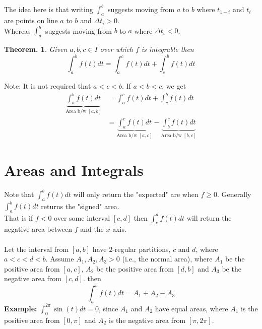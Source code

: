 \documentclass[11pt, a4paper]{memoir}
\theoremstyle{change}
\newtheorem{theorem}{Theorem.}[section]
\theoremstyle{plain}
\theoremstyle{nonumberplain}
\numberwithin{equation}{section}
\begin{document}
The idea here is that writing $\int^b_a$ suggests moving from $a$ to $b$ where $t_{1-i}$ and $t_i$ are points on line $a$ to $b$ and $\Delta t_i > 0$.\\
Whereas $\int^b_a$ suggests moving from $b$ to $a$ where $\Delta t_i < 0$.
\begin{theorem}
Given $a, b, c \in I$ over which $f$ is integrable then $$\int^b_a f(t) dt = \int^c_a f(t) dt + \int^b_c f(t) dt$$
\end{theorem}
Note: It is not required that $a < c < b$. 
If $a< b< c$, we get
\begin{align*}
    \underbrace{\int^b_a f(t) dt}_{\text{Area b/w } [a, b]} &= \int^c_a f(t) dt + \int^b_c f(t) dt\\
    &= \underbrace{\int^c_a f(t) dt}_{\text{Area b/w }[a, c]} -\underbrace{\int^c_b f(t) dt}_{\text{Area b/w }[b, c]}
\end{align*}

\section{Areas and Integrals}
Note that $\int^b_a f(t) dt$ will only return the "expected" are when $f \ge 0$. Generally $\int^b_a f(t) dt$ returns the "signed" area.\\
That is if $f < 0$ over some interval $[c, d]$ then $\int^d_c f(t) dt$ will return the negative area between $f$ and the $x$-axis.\\ \space \\
Let the interval from $[a, b]$ have $2$-regular partitions, $c$ and $d$, where $a < c < d < b$. Assume $A_1, A_2, A_3 > 0$ (i.e., the normal area), where $A_1$ be the positive area from $[a, c]$, $A_2$ be the positive area from $[d, b]$ and $A_3$ be the negative area from $[c, d]$.
then $$\int^b_a f(t) dt = A_1 + A_2 - A_3$$
\textbf{Example:}
$\int^{2\pi}_0 \sin(t) dt = 0$, since $A_1$ and $A_2$ have equal areas, where $A_1$ is the positive area from $[0, \pi]$ and $A_2$ is the negative area from $[\pi, 2\pi]$.
\end{document}
